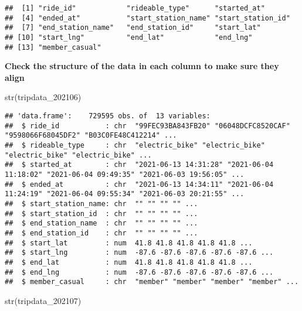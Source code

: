 \documentclass[
]{article}
\newenvironment{Shaded}{\begin{snugshade}}{\end{snugshade}}
\newcommand{\FunctionTok}[1]{\textcolor[rgb]{0.00,0.00,0.00}{#1}}
\newcommand{\NormalTok}[1]{#1}
\begin{document}
\begin{verbatim}
##  [1] "ride_id"            "rideable_type"      "started_at"        
##  [4] "ended_at"           "start_station_name" "start_station_id"  
##  [7] "end_station_name"   "end_station_id"     "start_lat"         
## [10] "start_lng"          "end_lat"            "end_lng"           
## [13] "member_casual"
\end{verbatim}

\textbf{Check the structure of the data in each column to make sure they
align}

\begin{Shaded}
\begin{Highlighting}[]
\FunctionTok{str}\NormalTok{(tripdata\_202106)}
\end{Highlighting}
\end{Shaded}

\begin{verbatim}
## 'data.frame':    729595 obs. of  13 variables:
##  $ ride_id           : chr  "99FEC93BA843FB20" "06048DCFC8520CAF" "9598066F68045DF2" "B03C0FE48C412214" ...
##  $ rideable_type     : chr  "electric_bike" "electric_bike" "electric_bike" "electric_bike" ...
##  $ started_at        : chr  "2021-06-13 14:31:28" "2021-06-04 11:18:02" "2021-06-04 09:49:35" "2021-06-03 19:56:05" ...
##  $ ended_at          : chr  "2021-06-13 14:34:11" "2021-06-04 11:24:19" "2021-06-04 09:55:34" "2021-06-03 20:21:55" ...
##  $ start_station_name: chr  "" "" "" "" ...
##  $ start_station_id  : chr  "" "" "" "" ...
##  $ end_station_name  : chr  "" "" "" "" ...
##  $ end_station_id    : chr  "" "" "" "" ...
##  $ start_lat         : num  41.8 41.8 41.8 41.8 41.8 ...
##  $ start_lng         : num  -87.6 -87.6 -87.6 -87.6 -87.6 ...
##  $ end_lat           : num  41.8 41.8 41.8 41.8 41.8 ...
##  $ end_lng           : num  -87.6 -87.6 -87.6 -87.6 -87.6 ...
##  $ member_casual     : chr  "member" "member" "member" "member" ...
\end{verbatim}

\begin{Shaded}
\begin{Highlighting}[]
\FunctionTok{str}\NormalTok{(tripdata\_202107)}
\end{Highlighting}
\end{Shaded}
\end{document}

